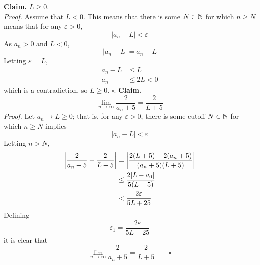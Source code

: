 \documentclass[./MATH137.tex]{subfiles}
\begin{document}
	\begin{tasks}
		\task
			\textbf{Claim.} \(L \ge 0\). \\
			\textit{Proof.}
				Assume that \(L < 0\). This means that there is some \(N \in \mathbb{N}\) for which \(n \ge N\) means that for any \(\varepsilon > 0\),
					\[|a_n - L| < \varepsilon\]
					As \(a_n > 0\) and \(L < 0\),
					\[|a_n - L| = a_n - L\]
					Letting \(\varepsilon = L\),
					\begin{align*}
						a_n - L &\le L \\
						a_n & \le 2L < 0
					\end{align*}
					which is a contradiction, so \(L \ge 0\). \(\square\).
			\task
				\textbf{Claim.} \[\lim_{n \to \infty} \frac{2}{a_n + 5} = \frac{2}{L + 5}\]
				\textit{Proof.}
					Let \(a_n \to L \ge 0\); that is, for any \(\varepsilon > 0\), there is some cutoff \(N \in \mathbb{N}\) for which \(n \ge N\) implies
						\[|a_n - L| < \varepsilon\]
						Letting \(n > N\),
						\begin{align*}
							\abs{\frac{2}{a_n + 5} - \frac{2}{L + 5}} &= \abs{\frac{2(L + 5) - 2(a_n + 5)}{(a_n + 5)(L + 5)}} \\
								&\le \frac{2|L - a_0|}{5(L + 5)} \\
								&< \frac{2\varepsilon}{5L + 25}
						\end{align*}
						Defining 
						\[\varepsilon_1 = \frac{2\varepsilon}{5L + 25}\]
						it is clear that
						\[\lim_{n \to \infty} \frac{2}{a_n + 5} = \frac{2}{L + 5} \qquad \square\]
	\end{tasks}
\end{document}
